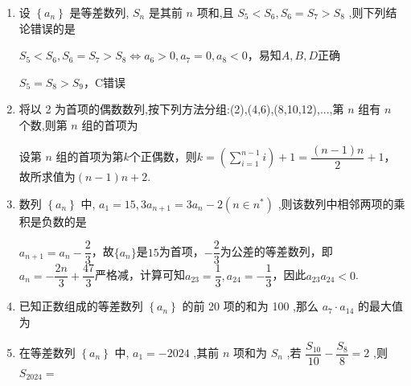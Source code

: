 \begin{enumerate}
\begin{jieda}
        所以数列 $\left\{  {T}_{n}\right\}$ 无最大项,数列 $\left\{  {T}_{n}\right\}$ 有最小项 ${T}_{5} =  - {10395}$ .
    \end{jieda}

    \item 设 $\left\{  {a}_{n}\right\}$ 是等差数列, ${S}_{n}$ 是其前 $n$ 项和,且 ${S}_{5} < {S}_{6},{S}_{6} = {S}_{7} > {S}_{8}$ ,则下列结论错误的是 
    \begin{jieda}
        ${S}_{5} < {S}_{6},{S}_{6} = {S}_{7} > {S}_{8} \Longleftrightarrow a_6 > 0, a_7 = 0, a_8 < 0$，易知$A,B,D$正确

        $S_5 = S_8 > S_9$，C错误
    \end{jieda}
    
    \item 将以 2 为首项的偶数数列,按下列方法分组:(2),(4,6),(8,10,12),...,第 $n$ 组有 $n$ 个数,则第 $n$ 组的首项为 
    \begin{jieda}
        设第 $n$ 组的首项为第$k$个正偶数，则$k = \left(\sum_{i = 1}^{n-1}i\right)+1 = \dfrac{(n-1)n}{2}+1$，故所求值为$(n-1)n+2$.
    \end{jieda}

    \item 数列 $\left\{  {a}_{n}\right\}$ 中, ${a}_{1} = {15},3{a}_{n + 1} = 3{a}_{n} - 2\left( {n \in  {n}^{ * }}\right)$ ,则该数列中相邻两项的乘积是负数的是
    \begin{jieda}
        ${a}_{n + 1} = {a}_{n} - \dfrac{2}{3}$，故$\{a_n\}$是$15$为首项，$-\dfrac{2}{3}$为公差的等差数列，即$a_n = -\dfrac{2n}{3}+\dfrac{47}{3}$严格减，计算可知$a_{23} = \dfrac{1}{3}, a_{24} = -\dfrac{1}{3}$，因此$a_{23}a_{24} < 0$.
    \end{jieda}
    
    \item 已知正数组成的等差数列 $\left\{  {a}_{n}\right\}$ 的前 20 项的和为 100 ,那么 ${a}_{7} \cdot  {a}_{14}$ 的最大值为 

    \item 在等差数列 $\left\{  {a}_{n}\right\}$ 中, ${a}_{1} =  - {2024}$ ,其前 $n$ 项和为 ${S}_{n}$ ,若 $\dfrac{{S}_{10}}{10} - \dfrac{{S}_{8}}{8} = 2$ ,则 ${S}_{2024} =$ 
    

\end{enumerate}
